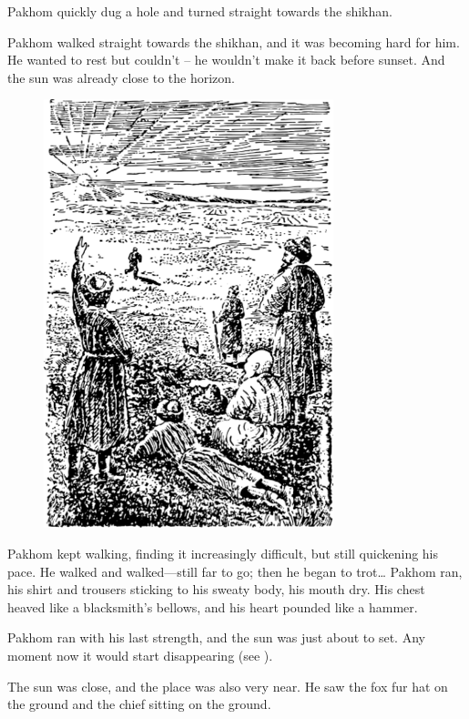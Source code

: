 Pakhom quickly dug a hole and turned straight towards the shikhan.

Pakhom walked straight towards the shikhan, and it was becoming hard for him. He wanted to rest but couldn’t -- he wouldn’t make it back before sunset. And the sun was already close to the horizon.

\begin{figure}[h!]
\centering
\includegraphics[width=0.75\textwidth]{figures/ch-12/fig-174.pdf}
\end{figure}

Pakhom kept walking, finding it increasingly difficult, but still quickening his pace. He walked and walked—still far to go; then he began to trot\dots{} Pakhom ran, his shirt and trousers sticking to his sweaty body, his mouth dry. His chest heaved like a blacksmith’s bellows, and his heart pounded like a hammer.

Pakhom ran with his last strength, and the sun was just about to set. Any moment now it would start disappearing (see ).

The sun was close, and the place was also very near. He saw the fox fur hat on the ground and the chief sitting on the ground.




